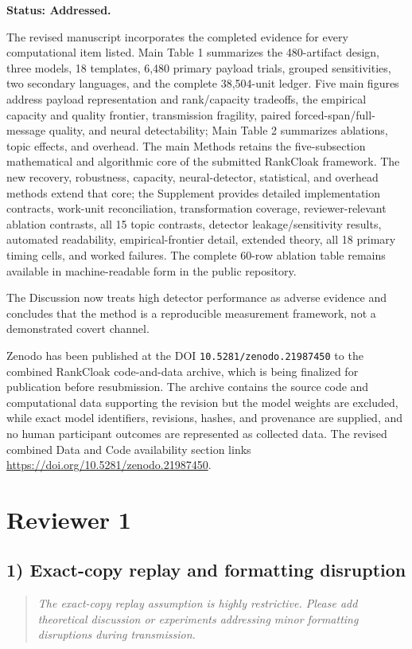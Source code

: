 \documentclass[11pt]{article}
\newcommand{\Status}[1]{\textbf{Status: #1.}}
\newenvironment{reviewcomment}{\begin{quote}\color{commentgray}\itshape}{\end{quote}}
\begin{document}
\Status{Addressed}

The revised manuscript incorporates the completed evidence for every computational item listed. Main Table 1 summarizes the 480-artifact design, three models, 18 templates, 6,480 primary payload trials, grouped sensitivities, two secondary languages, and the complete 38,504-unit ledger. Five main figures address payload representation and rank/capacity tradeoffs, the empirical capacity and quality frontier, transmission fragility, paired forced-span/full-message quality, and neural detectability; Main Table 2 summarizes ablations, topic effects, and overhead. The main Methods retains the five-subsection mathematical and algorithmic core of the submitted RankCloak framework. The new recovery, robustness, capacity, neural-detector, statistical, and overhead methods extend that core; the Supplement provides detailed implementation contracts, work-unit reconciliation, transformation coverage, reviewer-relevant ablation contrasts, all 15 topic contrasts, detector leakage/sensitivity results, automated readability, empirical-frontier detail, extended theory, all 18 primary timing cells, and worked failures. The complete 60-row ablation table remains available in machine-readable form in the public repository.

The Discussion now treats high detector performance as adverse evidence and concludes that the method is a reproducible measurement framework, not a demonstrated covert channel. 

Zenodo has been published at the DOI \texttt{10.5281/zenodo.21987450} to the combined RankCloak code-and-data archive, which is being finalized for publication before resubmission. The archive contains the source code and computational data supporting the revision but the  model weights are excluded, while exact model identifiers, revisions, hashes, and provenance are supplied, and no human participant outcomes are represented as collected data. The revised combined Data and Code availability section links \url{https://doi.org/10.5281/zenodo.21987450}. 


\section*{Reviewer 1}

\subsection*{1) Exact-copy replay and formatting disruption}
\begin{reviewcomment}
The exact-copy replay assumption is highly restrictive. Please add theoretical discussion or experiments addressing minor formatting disruptions during transmission.
\end{reviewcomment}
\end{document}
